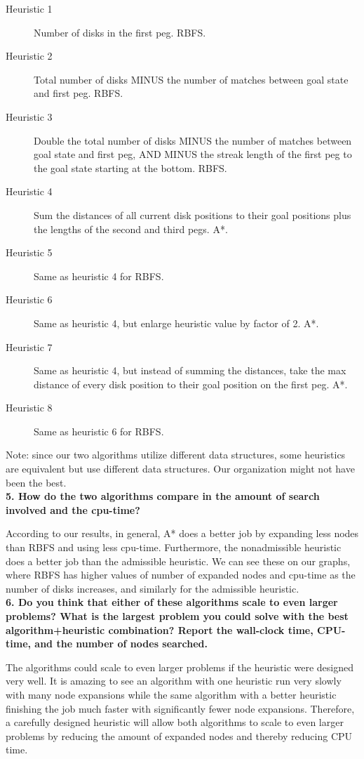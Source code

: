 \begin{description}
	\item[Heuristic 1] Number of disks in the first peg. RBFS.
	\item[Heuristic 2] Total number of disks MINUS the number of matches between goal state and first peg. RBFS.
	\item[Heuristic 3] Double the total number of disks MINUS the number of matches between goal state and first peg, AND MINUS the streak length of the first peg to the goal state starting at the bottom. RBFS.
	\item[Heuristic 4] Sum the distances of all current disk positions to their goal positions plus the lengths of the second and third pegs. A*.
	\item[Heuristic 5] Same as heuristic 4 for RBFS.
	\item[Heuristic 6] Same as heuristic 4, but enlarge heuristic value by factor of 2. A*. 
	\item[Heuristic 7] Same as heuristic 4, but instead of summing the distances, take the max distance of every disk position to their goal position on the first peg. A*.
	\item[Heuristic 8] Same as heuristic 6 for RBFS.
\end{description}

Note: since our two algorithms utilize different data structures, some heuristics are equivalent but use different data structures. Our organization might not have been the best.\\

\textbf{5. How do the two algorithms compare in the amount of search involved and the cpu-time?}

According to our results, in general, A* does a better job by expanding less nodes than RBFS and using less cpu-time. Furthermore, the nonadmissible heuristic does a better job than the admissible heuristic. We can see these on our graphs, where RBFS has higher values of number of expanded nodes and cpu-time as the number of disks increases, and similarly for the admissible heuristic.\\

\textbf{6. Do you think that either of these algorithms scale to even larger problems? What is the largest problem you could solve with the best algorithm+heuristic combination? Report the wall-clock time, CPU-time, and the number of nodes searched.}

The algorithms could scale to even larger problems if the heuristic were designed very well. It is amazing to see an algorithm with one heuristic run very slowly with many node expansions while the same algorithm with a better heuristic finishing the job much faster with significantly fewer node expansions. Therefore, a carefully designed heuristic will allow both algorithms to scale to even larger problems by reducing the amount of expanded nodes and thereby reducing CPU time.

